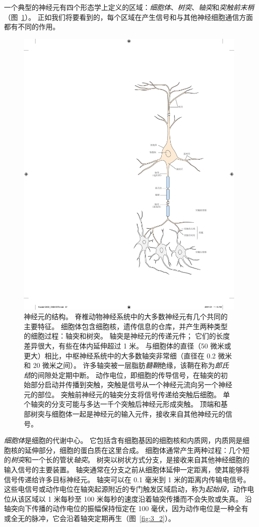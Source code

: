 一个典型的神经元有四个形态学上定义的区域：\textit{细胞体}、\textit{树突}、\textit{轴突}和\textit{突触前末梢}（图~\ref{fig:3_1}）。 
正如我们将要看到的，每个区域在产生信号和与其他神经细胞通信方面都有不同的作用。


\begin{figure}[htbp]
	\centering
	\includegraphics[width=0.65\linewidth]{chap03/fig_3_1}
	\caption{神经元的结构。 
		脊椎动物神经系统中的大多数神经元有几个共同的主要特征。 
		细胞体包含细胞核，遗传信息的仓库，并产生两种类型的细胞过程：轴突和树突。 
		轴突是神经元的传递元件；
		它们的长度差异很大，有些在体内延伸超过 1 米。 
		与细胞体的直径（50 微米或更大）相比，中枢神经系统中的大多数轴突非常细（直径在 0.2 微米和 20 微米之间）。 
		许多轴突被一层脂肪\textit{髓鞘}绝缘，该鞘在称为\textit{郎氏结}的间隙处定期中断。 
		动作电位，即细胞的传导信号，在轴突的初始部分启动并传播到突触，突触是信号从一个神经元流向另一个神经元的部位。 
		突触前神经元的轴突分支将信号传递给突触后细胞。 
		单个轴突的分支可能与多达一千个突触后神经元形成突触。 
		顶端和基部树突与细胞体一起是神经元的输入元件，接收来自其他神经元的信号。}
	\label{fig:3_1}
\end{figure}


\textit{细胞体}是细胞的代谢中心。 
它包括含有细胞基因的细胞核和内质网，内质网是细胞核的延伸部分，细胞的蛋白质在这里合成。
细胞体通常产生两种过程：几个短的\textit{树突}和一个长的管状\textit{轴突}。 
树突以树状方式分支，是接收来自其他神经细胞的输入信号的主要装置。 
轴突通常在分支之前从细胞体延伸一定距离，使其能够将信号传递给许多目标神经元。
轴突可以在 0.1 毫米到 1 米的距离内传输电信号。 
这些电信号或动作电位在轴突起源附近的专门触发区域启动，称为\textit{起始段}，动作电位从该区域以 1 米每秒至 100 米每秒的速度沿着轴突传播而不会失败或失真。 
沿轴突向下传播的动作电位的振幅保持恒定在 100 毫伏，因为动作电位是一种全有或全无的脉冲，它会沿着轴突定期再生（图~\ref{fig:3_2}）。


